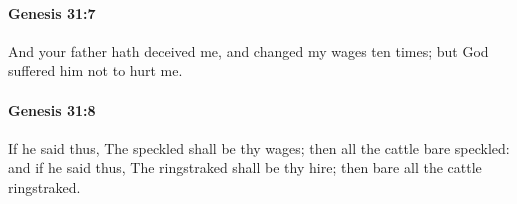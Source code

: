 		\paragraph{Genesis 31:7} %
			\label{GENESIS-31-7}

			And your father hath deceived me, and changed my wages ten times; but God suffered him not to hurt me.


		\paragraph{Genesis 31:8} %
			\label{GENESIS-31-8}

			If he said thus, The speckled shall be thy wages; then all the cattle bare speckled: and if he said thus, The ringstraked shall be thy hire; then bare all the cattle ringstraked.


